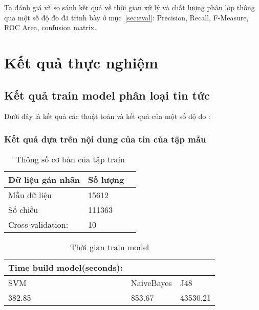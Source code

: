 Ta đánh giá và so sánh kết quả về thời gian xử lý và chất lượng phân lớp thông qua một số độ đo đã trình bày ở mục~\ref{sec:eval}: Precision, Recall, F-Measure, ROC Area, confusion matrix.

\section{Kết quả thực nghiệm}

	\subsection{Kết quả train model phân loại tin tức}
	Dưới đây là kết quả các thuật toán và kết quả của một số độ đo :
	\subsubsection{Kết quả dựa trên nội dung của tin của tập mẫu}
	\begin{table}[H]
		\centering
		\setlength\extrarowheight{3pt}
		\begin{tabular}{|l|l|l|}
			\hline
			Dữ liệu gán nhãn & Số lượng \\
			\hline
			Mẫu dữ liệu   & 15612\\
			\hline
			Số chiều   & 111363\\
			\hline
			Cross-validation:   & 10\\
			\hline
		\end{tabular}%
		\caption{Thông số cơ bản của tập train} \label{tab:table_4_3}%
	\end{table}
	\begin{table}[H]
		\centering
		\begin{tabular}{|l|l|l|}
			\hline
			Time build model(seconds): &            &          \\
			\hline
			SVM                        & NaiveBayes & J48      \\
			\hline
			382.85                     & 853.67     & 43530.21 \\
			\hline
		\end{tabular}
		\caption{Thời gian train model}
		\label{tab:table_4_4}
	\end{table}
